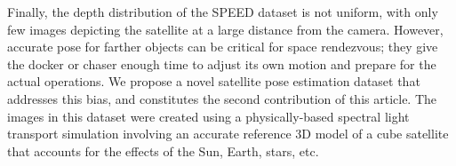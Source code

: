 Finally, the depth distribution of the SPEED dataset is not uniform, with only few images depicting the satellite at a large distance from the camera. However, accurate pose for farther objects can be critical for space rendezvous; they give the docker or chaser enough time to adjust its own motion and prepare for the actual operations.
We propose a novel satellite pose estimation dataset that addresses this bias,
and constitutes the second contribution of this article. The images in
this dataset were created using a physically-based spectral light transport simulation
involving an accurate reference 3D model of a cube satellite that accounts for
the effects of the Sun, Earth, stars, etc.

